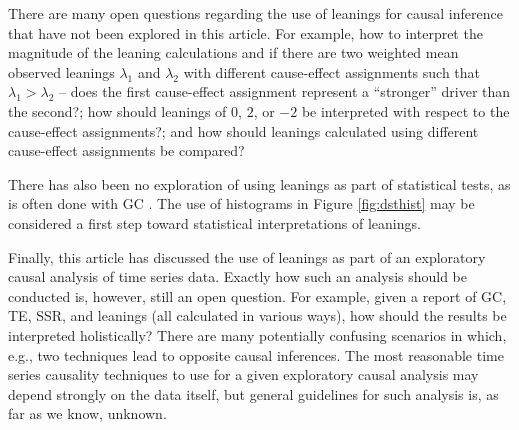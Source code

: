 \documentclass[twocolumn,aps,pre,groupedaddress]{revtex4-1}
\begin{document}
There are many open questions regarding the use of leanings for causal inference that have not been explored in this article.  For example, how to interpret the magnitude of the leaning calculations and if there are two weighted mean observed leanings $\lambda_1$ and $\lambda_2$ with different cause-effect assignments such that $\lambda_1 > \lambda_2$ -- does the first cause-effect assignment represent a ``stronger'' driver than the second?; how should leanings of $0$, $2$, or $-2$ be interpreted with respect to the cause-effect assignments?; and how should leanings calculated using different cause-effect assignments be compared?

There has also been no exploration of using leanings as part of statistical tests, as is often done with GC \cite{Pierce1977}.  The use of histograms in Figure \ref{fig:dsthist} may be considered a first step toward statistical interpretations of leanings.

Finally, this article has discussed the use of leanings as part of an exploratory causal analysis of time series data.  Exactly how such an analysis should be conducted is, however, still an open question.  For example, given a report of GC, TE, SSR, and leanings (all calculated in various ways), how should the results be interpreted holistically?  There are many potentially confusing scenarios in which, e.g., two techniques lead to opposite causal inferences.  The most reasonable time series causality techniques to use for a given exploratory causal analysis may depend strongly on the data itself, but general guidelines for such analysis is, as far as we know, unknown.



\end{document}
